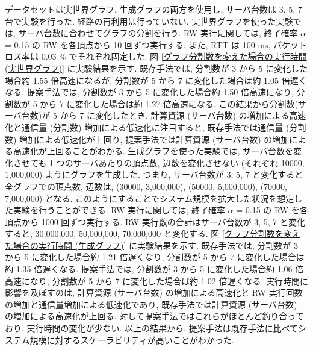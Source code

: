 データセットは実世界グラフ, 生成グラフの両方を使用し, サーバ台数は 3, 5, 7 台で実験を行った. 経路の再利用は行っていない. 実世界グラフを使った実験では, サーバ台数に合わせてグラフの分割を行う. RW 実行に関しては, 終了確率 $\alpha$ = 0.15 の RW を各頂点から 10 回ずつ実行する. また, RTT は 100 ms, パケットロス率は 0.03 \% でそれぞれ固定した. 図 \ref{グラフ分割数を変えた場合の実行時間 (実世界グラフ)} に実験結果を示す. 既存手法では, 分割数が 3 から 5 に変化した場合約 1.55 倍高速になるが, 分割数が 5 から 7 に変化した場合は約 1.05 倍遅くなる. 提案手法では, 分割数が 3 から 5 に変化した場合約 1.50 倍高速になり, 分割数が 5 から 7 に変化した場合は約 1.27 倍高速になる. この結果から分割数(サーバ台数)が 5 から 7 に変化したとき, 計算資源 (サーバ台数) の増加による高速化と通信量 (分割数) 増加による低速化に注目すると, 既存手法では通信量 (分割数) 増加による低速化が上回り, 提案手法では計算資源 (サーバ台数) の増加による高速化が上回ることがわかる. 生成グラフを使った実験では, サーバ台数を変化させても 1 つのサーバあたりの頂点数, 辺数を変化させない (それぞれ 10000, 1,000,000) ようにグラフを生成した. つまり, サーバ台数が 3, 5, 7 と変化すると全グラフでの頂点数, 辺数は, (30000, 3,000,000), (50000, 5,000,000), (70000, 7,000,000) となる. このようにすることでシステム規模を拡大した状況を想定した実験を行うことができる. RW 実行に関しては, 終了確率 $\alpha$ = 0.15 の RW を各頂点から 1000 回ずつ実行する. RW 実行数の合計はサーバ台数が 3, 5, 7 と変化すると, 30,000,000, 50,000,000, 70,000,000 と変化する. 図 \ref{グラフ分割数を変えた場合の実行時間 (生成グラフ)} に実験結果を示す. 既存手法では, 分割数が 3 から 5 に変化した場合約 1.21 倍遅くなり, 分割数が 5 から 7 に変化した場合は約 1.35 倍遅くなる. 提案手法では, 分割数が 3 から 5 に変化した場合約 1.06 倍高速になり, 分割数が 5 から 7 に変化した場合は約 1.02 倍遅くなる. 実行時間に影響を及ぼすのは, 計算資源 (サーバ台数) の増加による高速化と RW 実行回数の増加と通信量増加による低速化であり, 既存手法では計算資源 (サーバ台数) の増加による高速化が上回る. 対して提案手法ではこれらがほとんど釣り合っており, 実行時間の変化が少ない. 以上の結果から, 提案手法は既存手法に比べてシステム規模に対するスケーラビリティが高いことがわかった. 

